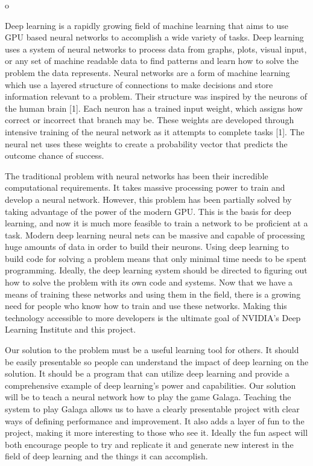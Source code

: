 o\documentclass[letterpaper,10pt]{article}
\begin{document}
Deep learning is a rapidly growing field of machine learning that aims to use GPU based neural networks to accomplish a wide variety of tasks.
Deep learning uses a system of neural networks to process data from graphs, plots, visual input, or any set of machine readable data to find patterns and learn how to solve the problem the data represents.
Neural networks are a form of machine learning which use a layered structure of connections to make decisions and store information relevant to a problem.
Their structure was inspired by the neurons of the human brain [1].
Each neuron has a trained input weight, which assigns how correct or incorrect that branch may be.
These weights are developed through intensive training of the neural network as it attempts to complete tasks [1].
The neural net uses these weights to create a probability vector that predicts the outcome chance of success.


The traditional problem with neural networks has been their incredible computational requirements.
 It takes massive processing power to train and develop a neural network.
 However, this problem has been partially solved by taking advantage of the power of the modern GPU.
 This is the basis for deep learning, and now it is much more feasible to train a network to be proficient at a task.
 Modern deep learning neural nets can be massive and capable of processing huge amounts of data in order to build their neurons.
 Using deep learning to build code for solving a problem means that only minimal time needs to be spent programming.
 Ideally, the deep learning system should be directed to figuring out how to solve the problem with its own code and systems.
 Now that we have a means of training these networks and using them in the field, there is a growing need for people who know how to train and use these networks.
 Making this technology accessible to more developers is the ultimate goal of NVIDIA's Deep Learning Institute and this project.


Our solution to the problem must be a useful learning tool for others. 
It should be easily presentable so people can understand the impact of deep learning on the solution.
 It should be a program that can utilize deep learning and provide a comprehensive example of deep learning's power and capabilities.
 Our solution will be to teach a neural network how to play the game Galaga. 
 Teaching the system to play Galaga allows us to have a clearly presentable project with clear ways of defining performance and improvement.
 It also adds a layer of fun to the project, making it more interesting to those who see it.
 Ideally the fun aspect will both encourage people to try and replicate it and generate new interest in the field of deep learning and the things it can accomplish.
\end{document}
